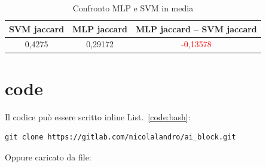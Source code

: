 \begin {table}[H]
\caption {Confronto MLP e SVM in media} \label{tab:mlp} 
\begin{center}
\begin{tabular}{|c|c|c|}
  
  \hline
  \rowcolor[gray]{.6}
  \textbf{SVM jaccard} & \textbf{MLP jaccard} & \textbf{MLP jaccard – SVM jaccard} \\
  
  \hline
  \rowcolor[gray]{.8}
  0,4275 & 0,29172 & \textcolor{red}{-0,13578}\\
  \hline
\end{tabular} 
\end{center}
\end{table}

\section{code}

Il codice può essere scritto inline List.~\ref{code:bash}:
\begin{lstlisting}[language=DebianBash, style=basic, label=code:bash, caption=sample bash]
git clone https://gitlab.com/nicolalandro/ai_block.git
\end{lstlisting}

Oppure caricato da file:

